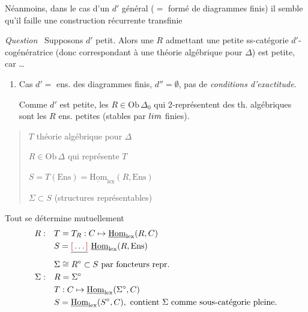\documentclass[11pt,a4paper]{article}
\begin{document}
Néanmoins, dans le cas d'un $d'$ général ($=$ formé de diagrammes
finis) il semble qu'il faille une construction récurrente transfinie

\emph{Question}\ \struck{\ill{}} Supposons $d'$ petit. Alors une
$R$  admettant une petite ss-catégorie
$d'$-cogénératrice (donc  correspondant à une théorie
algébrique pour $\Delta$) est petite, car …

\begin{enumerate}
  \item[4°)] Cas $d' =$ ens. des diagrammes finis, $d'' = \emptyset$,
    pas de \emph{conditions d'exactitude}.

    Comme $d'$ est petite, les $R \in \mathrm{Ob}\,\Delta_{0}$ qui
    2-représentent des th. algébriques sont les $R$ ens. petites
    (stables par $\varprojlim$ finies). \struck{\ill{}} 
\end{enumerate}

    \begin{quote}
      $T$ théorie algébrique pour $\Delta$ 

      $R \in \mathrm{Ob}\,\Delta$ qui représente $T$ 

      $S = T(\mathrm{Ens}) = \underline{\mathrm{Hom}}_{\mathrm{lex}}(R,
      \mathrm{Ens})$ 

      $\Sigma \subset S$ (structures représentables)
    \end{quote}
    Tout se détermine mutuellement
    \begin{align*}
      R :\quad & T = T_{R} : C \mapsto
        \underline{\mathrm{Hom}}_{\mathrm{lex}}(R, C) \\
      & S = \struck{\ill{}}\ \underline{\mathrm{Hom}}_{\mathrm{lex}}(R,
        \mathrm{Ens}) \\
      & \Sigma \cong R^{\circ} \subset S \text{ par foncteurs repr.} \\
      \Sigma :\quad & R = \Sigma^{\circ} \\
      & T : C \mapsto \underline{\mathrm{Hom}}_{\mathrm{lex}}
        (\Sigma^{\circ}, C) \\
      & S = \underline{\mathrm{Hom}}_{\mathrm{lex}}(S^{\circ}, C),
        \text{ contient } \Sigma \text{ comme sous-catégorie pleine.}
    \end{align*}
\end{document}

